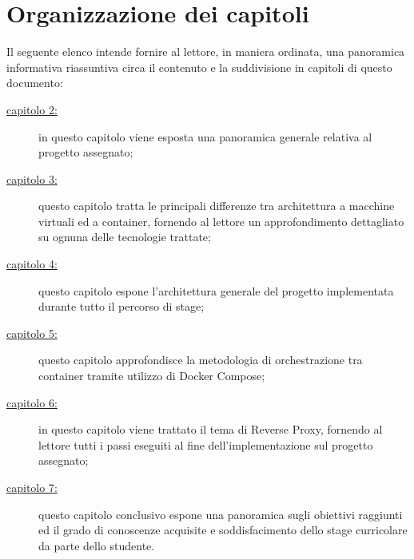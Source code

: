 \section{Organizzazione dei capitoli}
Il seguente elenco intende fornire al lettore, in maniera ordinata, una panoramica informativa riassuntiva circa il contenuto e la suddivisione in capitoli di questo documento:
\begin{description}
    \item[{\hyperref[cap:descrizione-stage]{capitolo 2:}}] in questo capitolo viene esposta una panoramica generale relativa al progetto assegnato;
    
    \item[{\hyperref[cap:container-vm]{capitolo 3:}}] questo capitolo tratta le principali differenze tra architettura a macchine virtuali ed a container, fornendo al lettore un approfondimento dettagliato su ognuna delle tecnologie trattate;
    
    \item[{\hyperref[cap:architettura-progetto-container]{capitolo 4:}}] questo capitolo espone l'architettura generale del progetto implementata durante tutto il percorso di stage;
    
    \item[{\hyperref[cap:orchestrazione-container]{capitolo 5:}}] questo capitolo approfondisce la metodologia di orchestrazione tra container tramite utilizzo di Docker Compose;
    
    \item[{\hyperref[cap:nginx-reverse-proxy]{capitolo 6:}}] in questo capitolo viene trattato il tema di Reverse Proxy, fornendo al lettore tutti i passi eseguiti al fine dell'implementazione sul progetto assegnato;
    
    \item[{\hyperref[cap:conclusioni]{capitolo 7:}}] questo capitolo conclusivo espone una panoramica sugli obiettivi raggiunti ed il grado di conoscenze acquisite e soddisfacimento dello stage curricolare da parte dello studente. 
\end{description}